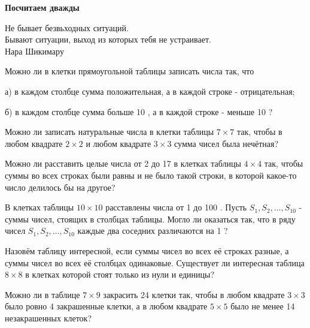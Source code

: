\centerline{\bf \Huge Посчитаем дважды}

\begin{flushright}
        \scriptsize{Не бывает безвьходных ситуаций.\\ Бывают ситуации, выход из которых тебя не устраивает.\\Нара Шикимару}
\end{flushright}

Можно ли в клетки прямоугольной таблицы записать числа так, что 

а) в каждом столбце сумма положительная, а в каждой строке - отрицательная;

б) в каждом столбце сумма больше 10 , а в каждой строке - меньше 10 ?

Можно ли записать натуральные числа в клетки таблицы $7 \times 7$ так, чтобы в любом квадрате $2 \times 2$ и любом квадрате $3 \times 3$ сумма чисел была нечётная?

Можно ли расставить целые числа от 2 до 17 в клетках таблицы $4 \times 4$ так, чтобы суммы во всех строках были равны и не было такой строки, в которой какое-то число делилось бы на другое?

В клетках таблицы $10 \times 10$ расставлены числа от 1 до 100 . Пусть $S_1, S_2, \ldots, S_{10}$ - суммы чисел, стоящих в столбцах таблицы. Могло ли оказаться так, что в ряду чисел $S_1, S_2, \ldots, S_{10}$ каждые два соседних различаются на 1 ?

Назовём таблицу интересной, если суммы чисел во всех её строках разные, а суммы чисел во всех её столбцах одинаковые. Существует ли интересная таблица $8 \times 8$ в клетках которой стоят только из нули и единицы?


Можно ли в таблице $7 \times 9$ закрасить 24 клетки так, чтобы в любом квадрате $3 \times 3$ было ровно 4 закрашенные клетки, а в любом квадрате $5 \times 5$ было не менее 14 незакрашенных клеток?